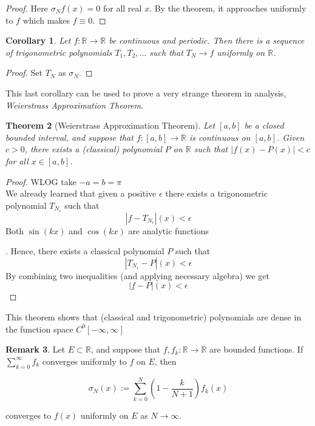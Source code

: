 \documentclass[12pt]{amsart}
\newtheorem{theorem}{Theorem}[section]
\newtheorem{corollary}[theorem]{Corollary}
\theoremstyle{definition}
\newtheorem{remark}[theorem]{Remark}
\begin{document}
\begin{proof}
    Here $\sigma_Nf(x) = 0$ for all real $x$. By the theorem, it approaches uniformly to \(f\) which makes $f \equiv 0$.
\end{proof}


\begin{corollary}
    Let $f : \mathbb{R} \rightarrow \mathbb{R}$ be continuous and periodic. Then there is a sequence of trigonometric polynomials $T_1, T_2, \ldots$ such that $T_N \rightarrow f$ uniformly on $\mathbb{R}$.
\end{corollary}


\begin{proof}
    Set $T_N$ as $\sigma_N$.
\end{proof}


This last corollary can be used to prove a very strange theorem in analysis, \textit{Weierstrass Approximation Theorem}.


\begin{theorem}[Weierstrass Approximation Theorem] Let $[a, b]$ be a closed bounded interval, and suppose that $f : [a, b] \rightarrow \mathbb{R}$ is continuous on $[a, b]$. Given $c > 0$, there exists a (classical) polynomial $P$ on $\mathbb{R}$ such that $|f(x) - P(x)| < c$ for all $x \in [a, b]$.
\end{theorem}


\begin{proof} WLOG take $-a = b = \pi$\\
    We already learned that given a positive $\epsilon$ there exists a trigonometric polynomial $T_{N_\epsilon}$ such that
    \[
    |f - T_{N_\epsilon}|(x) < \epsilon
    \]
    Both $\sin(kx)$ and $\cos(kx)$ are analytic functions \footnotemark{}



    . Hence, there exists a classical polynomial $P$ such that
    \[
    |T_{N_\epsilon} - P|(x) < \epsilon
    \]
    By combining two inequalities (and applying necessary algebra) we get
    \[
    |f - P|(x) < \epsilon
    \]
\end{proof}


This theorem shows that (classical and trigonometric) polynomials are dense in the function space $C^{0}[-\infty, \infty]$


\begin{remark}
    Let $E \subset \mathbb{R}$, and suppose that $f, f_k : \mathbb{R} \to \mathbb{R}$ are bounded functions. If $\sum_{k = 0}^{ \infty} f_k$ converges uniformly to $f$ on $E$, then

\[\sigma_N(x) := \sum_{k=0}^{N} (1 - \frac{k}{N+1}) f_k(x)\]

converges to $f(x)$ uniformly on $E$ as $N \to \infty$.
\end{remark}
\end{document}
